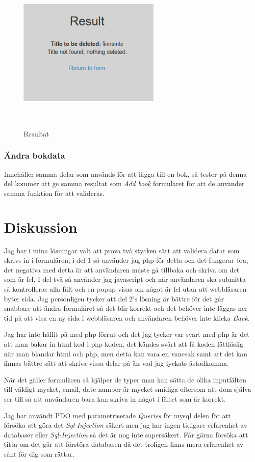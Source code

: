 \documentclass[11pt, titlepage, oneside, a4paper]{article}
\newcommand{\Section}[1]{\section{#1}\vspace{-8pt}}
\newcommand{\Subsubsection}[1]{\vspace{-4pt}\subsubsection{#1}\vspace{-8pt}}
\begin{document}
		\begin{figure}[ht!]
		\centering
		\includegraphics[width=70mm, height=80mm]{del2_delfail.png}
		\caption{Resultat}
		\end{figure}
		
		\Subsubsection{Ändra bokdata}
		Innehåller samma delar som används för att lägga till en bok, så tester på denna del kommer att ge samma resultat som \emph{Add book} formuläret för att de använder samma funktion för att valideras. 
		
		
	\Section{Diskussion}
 Jag har i mina lösningar valt att prova två stycken sätt att validera datat som skrivs in i formulären, i del 1 så använder jag php för detta och det fungerar bra, det negativa med detta
 är att användaren måste gå tillbaka och skriva om det som är fel.
 I del två så använder jag javascript och när användaren ska submitta så kontrolleras alla fält och en popup visas om något är fel utan att webbläsaren byter sida.
 Jag personligen tycker att del 2's lösning är bättre för det går snabbare att ändra formuläret så det blir korrekt och det behöver inte läggas ner tid på att visa en ny sida i webbläsaren och användaren behöver inte klicka \emph{Back}.

 Jag har inte hållit på med php förrut och det jag tycker var svårt med php är det att man bakar in html kod i php koden, det kändes svårt att få koden lättläslig när man blandar html och php, 
 men detta kan vara en vanesak samt att det kan finnas bättre sätt att skriva vissa delar på än vad jag lyckats åstadkomma.
 
 När det gäller formulären så hjälper de typer man kan sätta de olika inputfälten till väldigt mycket, email, date number är mycket smidiga eftersom att dom själva ser till så att användaren bara kan skriva in
 något i fältet som är korrekt.
 
 Jag har användt PDO med parametriserade \emph{Queries} för mysql delen för att försöka att göra det \emph{Sql-Injection} säkert men jag har ingen tidigare erfarenhet av databaser eller \emph{Sql-Injection} så det är nog inte supersäkert.
 Får gärna försöka att titta om det går att förstöra databasen då det troligen finns mera erfarenhet av sånt för dig som rättar.
 
\end{document}
